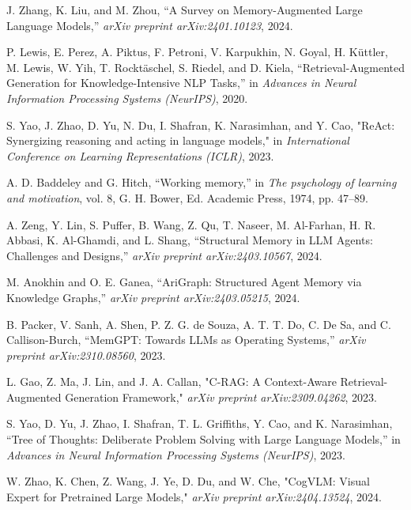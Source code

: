 \documentclass[journal,onecolumn]{IEEEtran}
\begin{document}
\begin{thebibliography}{10}

J. Zhang, K. Liu, and M. Zhou, “A Survey on Memory-Augmented Large Language Models,” \textit{arXiv preprint arXiv:2401.10123}, 2024.

P. Lewis, E. Perez, A. Piktus, F. Petroni, V. Karpukhin, N. Goyal, H. Küttler, M. Lewis, W. Yih, T. Rocktäschel, S. Riedel, and D. Kiela, “Retrieval-Augmented Generation for Knowledge-Intensive NLP Tasks,” in \textit{Advances in Neural Information Processing Systems (NeurIPS)}, 2020.

S. Yao, J. Zhao, D. Yu, N. Du, I. Shafran, K. Narasimhan, and Y. Cao, "ReAct: Synergizing reasoning and acting in language models," in \textit{International Conference on Learning Representations (ICLR)}, 2023.

A. D. Baddeley and G. Hitch, “Working memory,” in \textit{The psychology of learning and motivation}, vol. 8, G. H. Bower, Ed. Academic Press, 1974, pp. 47–89.

A. Zeng, Y. Lin, S. Puffer, B. Wang, Z. Qu, T. Naseer, M. Al-Farhan, H. R. Abbasi, K. Al-Ghamdi, and L. Shang, “Structural Memory in LLM Agents: Challenges and Designs,” \textit{arXiv preprint arXiv:2403.10567}, 2024.

M. Anokhin and O. E. Ganea, “AriGraph: Structured Agent Memory via Knowledge Graphs,” \textit{arXiv preprint arXiv:2403.05215}, 2024.

B. Packer, V. Sanh, A. Shen, P. Z. G. de Souza, A. T. T. Do, C. De Sa, and C. Callison-Burch, “MemGPT: Towards LLMs as Operating Systems,” \textit{arXiv preprint arXiv:2310.08560}, 2023.

L. Gao, Z. Ma, J. Lin, and J. A. Callan, "C-RAG: A Context-Aware Retrieval-Augmented Generation Framework," \textit{arXiv preprint arXiv:2309.04262}, 2023.

S. Yao, D. Yu, J. Zhao, I. Shafran, T. L. Griffiths, Y. Cao, and K. Narasimhan, “Tree of Thoughts: Deliberate Problem Solving with Large Language Models,” in \textit{Advances in Neural Information Processing Systems (NeurIPS)}, 2023.

W. Zhao, K. Chen, Z. Wang, J. Ye, D. Du, and W. Che, "CogVLM: Visual Expert for Pretrained Large Models," \textit{arXiv preprint arXiv:2404.13524}, 2024.

\end{thebibliography}
\end{document}

